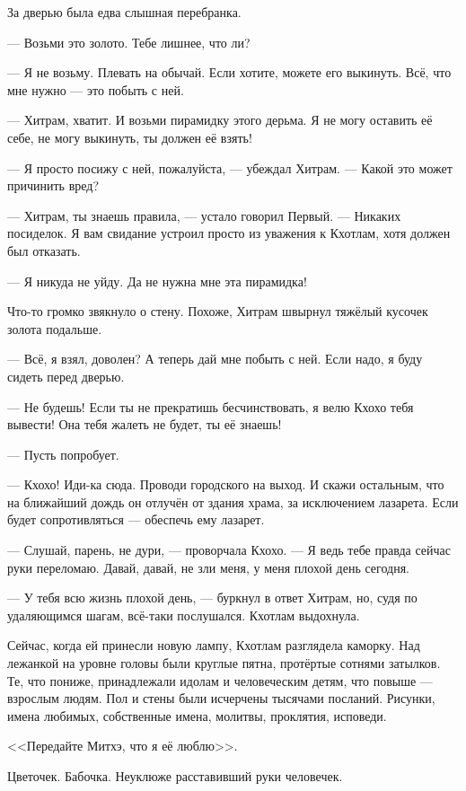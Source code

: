 За дверью была едва слышная перебранка.

--- Возьми это золото.
Тебе лишнее, что ли?

--- Я не возьму.
Плевать на обычай.
Если хотите, можете его выкинуть.
Всё, что мне нужно --- это побыть с ней.

--- Хитрам, хватит.
И возьми пирамидку этого дерьма.
Я не могу оставить её себе, не могу выкинуть, ты должен её взять!

--- Я просто посижу с ней, пожалуйста, --- убеждал Хитрам.
--- Какой это может причинить вред?

--- Хитрам, ты знаешь правила, --- устало говорил Первый.
--- Никаких посиделок.
Я вам свидание устроил просто из уважения к Кхотлам, хотя должен был отказать.

--- Я никуда не уйду.
Да не нужна мне эта пирамидка!

Что-то громко звякнуло о стену.
Похоже, Хитрам швырнул тяжёлый кусочек золота подальше.

--- Всё, я взял, доволен?
А теперь дай мне побыть с ней.
Если надо, я буду сидеть перед дверью.

--- Не будешь!
Если ты не прекратишь бесчинствовать, я велю Кхохо тебя вывести!
Она тебя жалеть не будет, ты её знаешь!

--- Пусть попробует.

--- Кхохо!
Иди-ка сюда.
Проводи городского на выход.
И скажи остальным, что на ближайший дождь он отлучён от здания храма, за исключением лазарета.
Если будет сопротивляться --- обеспечь ему лазарет.

--- Слушай, парень, не дури, --- проворчала Кхохо.
--- Я ведь тебе правда сейчас руки переломаю.
Давай, давай, не зли меня, у меня плохой день сегодня.

--- У тебя всю жизнь плохой день, --- буркнул в ответ Хитрам, но, судя по удаляющимся шагам, всё-таки послушался.
Кхотлам выдохнула.

\asterism

Сейчас, когда ей принесли новую лампу, Кхотлам разглядела каморку.
Над лежанкой на уровне головы были круглые пятна, протёртые сотнями затылков.
Те, что пониже, принадлежали идолам и человеческим детям, что повыше --- взрослым людям.
Пол и стены были исчерчены тысячами посланий.
Рисунки, имена любимых, собственные имена, молитвы, проклятия, исповеди.

<<Передайте Митхэ, что я её люблю>>.

Цветочек.
Бабочка.
Неуклюже расставивший руки человечек.

